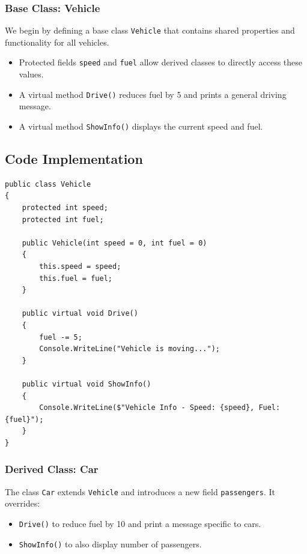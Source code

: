 \subsubsection{Base Class: Vehicle}
We begin by defining a base class \texttt{Vehicle} that contains shared properties and functionality for all vehicles.

\begin{itemize}
    \item Protected fields \texttt{speed} and \texttt{fuel} allow derived classes to directly access these values.
    \item A virtual method \texttt{Drive()} reduces fuel by 5 and prints a general driving message.
    \item A virtual method \texttt{ShowInfo()} displays the current speed and fuel.
\end{itemize}

\subsection*{Code Implementation}
\begin{lstlisting}
public class Vehicle
{
    protected int speed;
    protected int fuel;

    public Vehicle(int speed = 0, int fuel = 0)
    {
        this.speed = speed;
        this.fuel = fuel;
    }

    public virtual void Drive()
    {
        fuel -= 5;
        Console.WriteLine("Vehicle is moving...");
    }

    public virtual void ShowInfo()
    {
        Console.WriteLine($"Vehicle Info - Speed: {speed}, Fuel: {fuel}");
    }
}
\end{lstlisting}

\subsubsection{Derived Class: Car}
The class \texttt{Car} extends \texttt{Vehicle} and introduces a new field \texttt{passengers}.  
It overrides:
\begin{itemize}
    \item \texttt{Drive()} to reduce fuel by 10 and print a message specific to cars.
    \item \texttt{ShowInfo()} to also display number of passengers.
\end{itemize}

